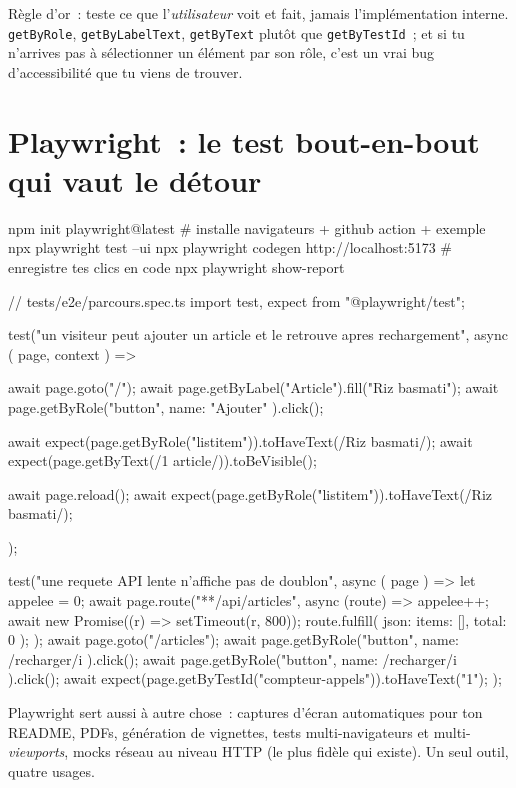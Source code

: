 R\`egle d'or~: teste ce que l'\emph{utilisateur} voit et fait, jamais l'impl\'ementation interne.
\verb|getByRole|, \verb|getByLabelText|, \verb|getByText| plut\^ot que \verb|getByTestId|~; et si
tu n'arrives pas \`a s\'electionner un \'el\'ement par son r\^ole, c'est un vrai bug d'accessibilit\'e
que tu viens de trouver.

\section{Playwright~: le test bout-en-bout qui vaut le d\'etour}

\begin{terminal}
npm init playwright@latest         # installe navigateurs + github action + exemple
npx playwright test --ui
npx playwright codegen http://localhost:5173   # enregistre tes clics en code
npx playwright show-report
\end{terminal}

\begin{codejs}
// tests/e2e/parcours.spec.ts
import { test, expect } from "@playwright/test";

test("un visiteur peut ajouter un article et le retrouve apres rechargement", async ({ page, context }) => {
  await page.goto("/");
  await page.getByLabel("Article").fill("Riz basmati");
  await page.getByRole("button", { name: "Ajouter" }).click();

  await expect(page.getByRole("listitem")).toHaveText(/Riz basmati/);
  await expect(page.getByText(/1 article/)).toBeVisible();

  await page.reload();
  await expect(page.getByRole("listitem")).toHaveText(/Riz basmati/);
});

test("une requete API lente n'affiche pas de doublon", async ({ page }) => {
  let appelee = 0;
  await page.route("**/api/articles", async (route) => {
    appelee++;
    await new Promise((r) => setTimeout(r, 800));
    route.fulfill({ json: { items: [], total: 0 } });
  });
  await page.goto("/articles");
  await page.getByRole("button", { name: /recharger/i }).click();
  await page.getByRole("button", { name: /recharger/i }).click();
  await expect(page.getByTestId("compteur-appels")).toHaveText("1");
});
\end{codejs}

\begin{note}
Playwright sert aussi \`a autre chose~: captures d'\'ecran automatiques pour ton README,
PDFs, g\'en\'eration de vignettes, tests multi-navigateurs et multi-\emph{viewports},
mocks r\'eseau au niveau HTTP (le plus fid\`ele qui existe). Un seul outil, quatre usages.
\end{note}

